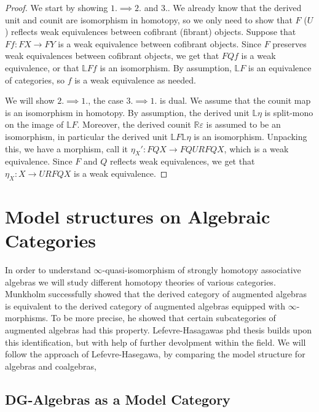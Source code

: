 \documentclass[../thesis.tex]{subfiles}
\begin{document}
            \begin{proof}
                We start by showing $1. \implies 2.$ and $3.$. We already know that the derived unit and counit are isomorphism in homotopy, so we only need to show that $F$ ($U$) reflects weak equivalences between cofibrant (fibrant) objects. Suppose that $Ff:FX\rightarrow FY$ is a weak equivalence between cofibrant objects. Since $F$ preserves weak equivalences between cofibrant objects, we get that $FQf$ is a weak equivalence, or that $\mathbb{L}Ff$ is an isomorphism. By assumption, $\mathbb{L}F$ is an equivalence of categories, so $f$ is a weak equivalence as needed.

                We will show $2.\implies 1.$, the case $3.\implies 1.$ is dual. We assume that the counit map is an isomorphism in homotopy. By assumption, the derived unit $\mathbb{L}\eta$ is split-mono on the image of $\mathbb{L}F$. Moreover, the derived counit $\mathbb{R}\varepsilon$ is assumed to be an isomorphism, in particular the derived unit $\mathbb{L}F\mathbb{L}\eta$ is an isomorphism. Unpacking this, we have a morphism, call it $\eta_X' : FQX \rightarrow FQURFQX$, which is a weak equivalence. Since $F$ and $Q$ reflects weak equivalences, we get that $\eta_X: X \rightarrow URFQX$ is a weak equivalence.
            \end{proof}

    \section{Model structures on Algebraic Categories}

            In order to understand $\infty$-quasi-isomorphism of strongly homotopy associative algebras we will study different homotopy theories of various categories. Munkholm \cite{Munkholm78} successfully showed that the derived category of  augmented algebras is equivalent to the derived category of augmented algebras equipped with $\infty$-morphisms. To be more precise, he showed that certain subcategories of augmented algebras had this property. Lefevre-Hasagawas phd thesis \cite{LefevreHasegawa03} builds upon this identification, but with help of further devolpment within the field. We will follow the approach of Lefevre-Hasegawa, by comparing the model structure for algebras and coalgebras,

        \subsection{DG-Algebras as a Model Category}
\end{document}
